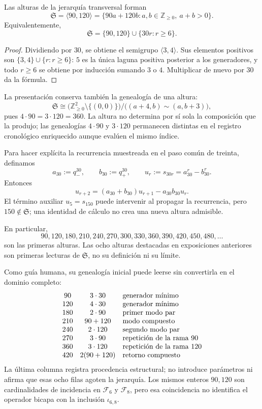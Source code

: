 \begin{theorem}
\label{thm:semigrupo-alturas-rev7}
Las alturas de la jerarquía transversal forman
\[
 \mathfrak S
 =\langle90,120\rangle
 =\{90a+120b:a,b\in\mathbb Z_{\ge0},\ a+b>0\}.
\]
Equivalentemente,
\[
 \boxed{\mathfrak S=\{90,120\}\cup\{30r:r\ge6\}.}
\]
\end{theorem}

\begin{proof}
Dividiendo por \(30\), se obtiene el semigrupo
\(\langle3,4\rangle\). Sus elementos positivos son
\(\{3,4\}\cup\{r:r\ge6\}\): \(5\) es la única laguna positiva posterior a
los generadores, y todo \(r\ge6\) se obtiene por inducción sumando \(3\) o
\(4\). Multiplicar de nuevo por \(30\) da la fórmula.
\end{proof}

La presentación conserva también la genealogía de una altura:
\[
 \mathfrak S\cong
 \bigl(\mathbb Z_{\ge0}^2\setminus\{(0,0)\}\bigr)
 \big/\bigl((a+4,b)\sim(a,b+3)\bigr),
\]
pues \(4\cdot90=3\cdot120=360\). La altura no determina por sí sola la
composición que la produjo; las genealogías \(4\cdot90\) y \(3\cdot120\)
permanecen distintas en el registro cronológico enriquecido aunque evalúen
el mismo índice.

Para hacer explícita la recurrencia muestreada en el paso común de treinta,
definamos
\[
 a_{30}:=q_-^{30},\qquad b_{30}:=q_+^{30},\qquad
 u_r:=s_{30r}=a_{30}^r-b_{30}^r.
\]
Entonces
\[
 \boxed{u_{r+2}=(a_{30}+b_{30})u_{r+1}-a_{30}b_{30}u_r.}
\]
El término auxiliar \(u_5=s_{150}\) puede intervenir al propagar la
recurrencia, pero \(150\notin\mathfrak S\); una identidad de cálculo no crea
una nueva altura admisible.

En particular,
\[
90,120,180,210,240,270,300,330,360,390,420,450,480,\ldots
\]
son las primeras alturas. Las ocho alturas destacadas en exposiciones
anteriores son primeras lecturas de \(\mathfrak S\), no su definición ni
su límite.

Como guía humana, su genealogía inicial puede leerse sin convertirla en el
dominio completo:
\[
\begin{array}{c@{\quad}c@{\quad}l}
90&3\cdot30&\text{generador mínimo}\\
120&4\cdot30&\text{generador mínimo}\\
180&2\cdot90&\text{primer modo par}\\
210&90+120&\text{modo compuesto}\\
240&2\cdot120&\text{segundo modo par}\\
270&3\cdot90&\text{repetición de la rama 90}\\
360&3\cdot120&\text{repetición de la rama 120}\\
420&2(90+120)&\text{retorno compuesto}
\end{array}
\]
La última columna registra procedencia estructural; no introduce parámetros
ni afirma que esas ocho filas agoten la jerarquía. Los mismos enteros
\(90,120\) son cardinalidades de incidencia en \(\mathcal F_6\) y
\(\mathcal F_8\), pero esa coincidencia no identifica el operador bicapa con
la inclusión \(\iota_{6,8}\).

